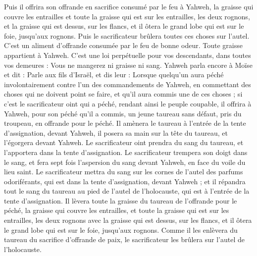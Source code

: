 \begin{multicols}{2}
Puis il offrira son offrande en sacrifice consumé par le feu à Yahweh, la graisse qui couvre les entrailles et toute la graisse qui est sur les entrailles,
les deux rognons, et la graisse qui est dessus, sur les flancs, et il ôtera le grand lobe qui est sur le foie, jusqu’aux rognons.
Puis le sacrificateur brûlera toutes ces choses sur l'autel. C'est un aliment d'offrande consumée par le feu de bonne odeur. Toute graisse appartient à Yahweh.
C'est une loi perpétuelle pour vos descendants, dans toutes vos demeures : Vous ne mangerez ni graisse ni sang.
\VerseOne{}Yahweh parla encore à Moïse et dit :
Parle aux fils d'Israël, et dis leur : Lorsque quelqu’un aura péché involontairement contre l’un des commandements de Yahweh, en commettant des choses qui ne doivent point se faire, et qu'il aura commis une de ces choses ;
si c'est le sacrificateur oint qui a péché, rendant ainsi le peuple coupable, il offrira à Yahweh, pour son péché qu'il a commis, un jeune taureau sans défaut, pris du troupeau, en offrande pour le péché.
Il amènera le taureau à l'entrée de la tente d'assignation, devant Yahweh, il posera sa main sur la tête du taureau, et l'égorgera devant Yahweh.
Le sacrificateur oint prendra du sang du taureau, et l'apportera dans la tente d'assignation.
Le sacrificateur trempera son doigt dans le sang, et fera sept fois l’aspersion du sang devant Yahweh, en face du voile du lieu saint.
Le sacrificateur mettra du sang sur les cornes de l'autel des parfums odoriférants, qui est dans la tente d'assignation, devant Yahweh ; et il répandra tout le sang du taureau au pied de l'autel de l'holocauste, qui est à l'entrée de la tente d'assignation.
Il lèvera toute la graisse du taureau de l'offrande pour le péché, la graisse qui couvre les entrailles, et toute la graisse qui est sur les entrailles,
les deux rognons avec la graisse qui est dessus, sur les flancs, et il ôtera le grand lobe qui est sur le foie, jusqu’aux rognons.
Comme il les enlèvera du taureau du sacrifice d’offrande de paix, le sacrificateur les brûlera sur l'autel de l'holocauste.

\end{multicols}
